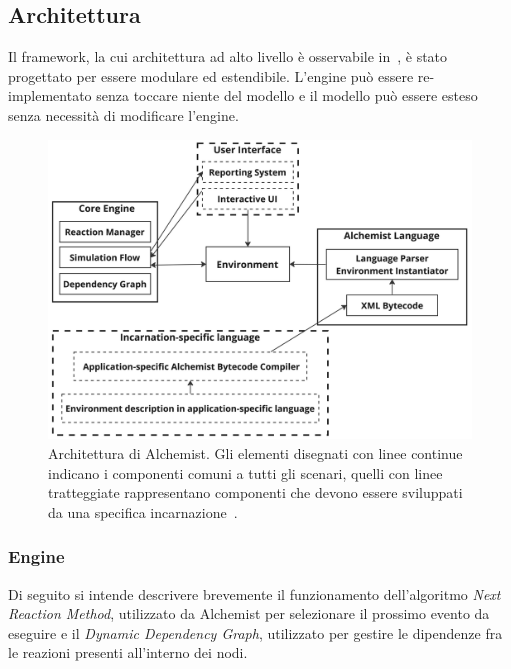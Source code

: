 \documentclass[12pt,a4paper,openright,twoside]{book}
\begin{document}
\subsection{Architettura}
Il framework, la cui architettura ad alto livello è osservabile in~, è stato progettato per essere modulare ed estendibile. L'engine può essere re-implementato senza toccare niente del modello e il modello può essere esteso senza necessità di modificare l'engine. 

\begin{figure}
    \centering
    \includegraphics[width=.85\linewidth]{figures/discrete-event-simulation/alchemist-architecture.jpg}
    \caption{Architettura di Alchemist. Gli elementi disegnati con linee continue indicano i componenti comuni a tutti gli scenari, quelli con linee tratteggiate rappresentano componenti che devono essere sviluppati da una specifica incarnazione~\cite{DBLP:journals/jos/PianiniMV13}.}
    \label{fig:alchemist-architecture}
\end{figure}

\subsubsection{Engine}
Di seguito si intende descrivere brevemente il funzionamento dell'algoritmo \textit{Next Reaction Method}, utilizzato da Alchemist per selezionare il prossimo evento da eseguire e il \textit{Dynamic Dependency Graph}, utilizzato per gestire le dipendenze fra le reazioni presenti all'interno dei nodi. 
\end{document}
